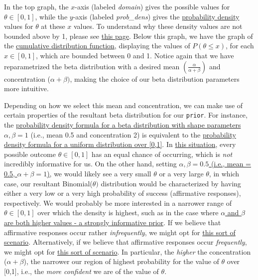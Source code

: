 In the top graph, the $x$-axis (labeled \textit{domain}) gives the possible values for $\theta \in [0,1]$, while the $y$-axis (labeled \textit{prob\_dens}) gives the \href{https://en.wikipedia.org/wiki/Probability_density_function}{probability density} values for $\theta$ at these $x$ values. To understand why these density values are not bounded above by 1, please see \href{http://math.stackexchange.com/questions/105455/how-can-a-probability-density-be-greater-than-one-and-integrate-to-one}{this page}. Below this graph, we have the graph of the \href{https://en.wikipedia.org/wiki/Cumulative_distribution_function}{cumulative distribution function}, displaying the values of $P(\theta \le x)$, for each $x \in [0,1]$, which are bounded between 0 and 1. Notice again that we have reparametrized the beta distribution with a desired mean $(\frac{\alpha}{\alpha + \beta})$ and concentration ($\alpha + \beta)$, making the choice of our beta distribution parameters more intuitive.

Depending on how we select this mean and concentration, we can make use of certain properties of the resultant beta distribution for our \texttt{prior}. For instance, the \href{https://en.wikipedia.org/wiki/Beta_distribution#Probability_density_function}{probability density formula for a beta distribution with shape parameters $\alpha, \beta = 1$} (i.e., mean 0.5 and concentration 2) is equivalent to the \href{https://en.wikipedia.org/wiki/Uniform_distribution_(continuous)#Probability_density_function}{probability density formula for a uniform distribution over [0,1]}. In \href{http://www.obscureanalytics.com/wp-content/uploads/2012/07/UniformBeta.png}{this situation}, every possible outcome $\theta \in [0,1]$ has an equal chance of occurring, which is \textit{not} incredibly informative for us. On the other hand, setting \href{http://www.obscureanalytics.com/wp-content/uploads/2012/07/BimodalBeta.png}{$\alpha, \beta = 0.5$ (i.e., mean = 0.5, $\alpha + \beta = 1$)}, we would likely see a very small $\theta$ or a very large $\theta$, in which case, our resultant Binomial($\theta)$ distribution would be characterized by having either a very low or a very high probability of success (affirmative responses), respectively. We would probably be more interested in a narrower range of $\theta \in [0,1]$ over which the density is highest, such as in the case where \href{http://www.obscureanalytics.com/wp-content/uploads/2012/07/StrongCentralBeta.png}{$\alpha$ and $\beta$ are both higher values - a strongly informative prior}. If we believe that affirmative responses occur rather \textit{infrequently}, we might opt for \href{http://www.obscureanalytics.com/wp-content/uploads/2012/07/StrongLowSuccessBeta.png}{this sort of scenario}. Alternatively, if we believe that affirmative responses occur \textit{frequently}, we might opt for \href{http://www.obscureanalytics.com/wp-content/uploads/2012/07/StrongHighSuccessBeta.png}{this sort of scenario}. In particular, the \textit{higher} the concentration ($\alpha + \beta$), the narrower our region of highest probability for the value of $\theta$ over [0,1], i.e., the \textit{more confident} we are of the value of $\theta$.

